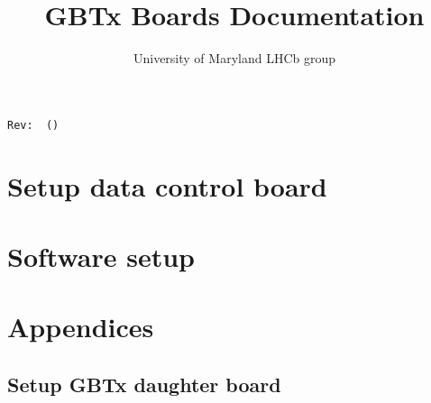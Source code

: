 \documentclass[11pt,letterpaper]{refart}
\title{GBTx Boards Documentation}
\author{University of Maryland LHCb group}
\begin{document}
\maketitle
\hfill\small{\texttt{Rev:~\gitRel~(\gitAbbrevHash)}}
\tableofcontents
\listoffigures
\clearpage



\section{Setup data control board}









\section{Software setup}









\newpage \appendix
\section*{Appendices}
\renewcommand{\thesubsection}{\Alph{subsection}}









\subsection{Setup GBTx daughter board}






\end{document}
